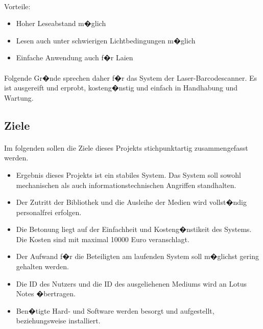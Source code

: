 \paragraph*{}
Vorteile:
\begin{itemize}
\item Hoher Leseabstand m�glich
\item Lesen auch unter schwierigen Lichtbedingungen m�glich
\item Einfache Anwendung auch f�r Laien
\end{itemize}

\paragraph*{}
Folgende Gr�nde sprechen daher f�r das System der Laser-Barcodescanner. Es ist ausgereift und erprobt, kosteng�nstig und einfach in Handhabung und Wartung. 

\subsection{Ziele}

\paragraph*{}
Im folgenden sollen die Ziele dieses Projekts stichpunktartig zusammengefasst werden.
\begin{itemize}
\item Ergebnis dieses Projekts ist ein stabiles System. Das System soll sowohl mechanischen als auch informationstechnischen Angriffen standhalten. 
\item Der Zutritt der Bibliothek und die Ausleihe der Medien wird vollst�ndig personalfrei erfolgen.
\item Die Betonung liegt auf der Einfachheit und Kosteng�nstikeit des Systems. Die Kosten sind mit maximal 10000 Euro  veranschlagt.
\item Der Aufwand f�r die Beteiligten am laufenden System soll m�glichst gering gehalten werden. 
\item Die ID des Nutzers und die ID des ausgeliehenen Mediums wird an Lotus Notes �bertragen.
\item Ben�tigte Hard- und Software werden besorgt und aufgestellt, beziehungsweise installiert.
\end{itemize}

